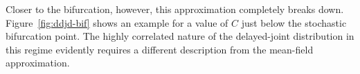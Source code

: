 \documentclass[english,letterpaper,12pt]{report}
\begin{document}
\begin{doublespacing}
Closer to the bifurcation, however, this approximation completely breaks down. Figure~\ref{fig:ddjd-bif} shows an example for a value of $C$ just below the stochastic bifurcation point. The highly correlated nature of the delayed-joint distribution in this regime evidently requires a different description from the mean-field approximation.

\begin{figure}
\end{figure}
\end{doublespacing}
\end{document}
